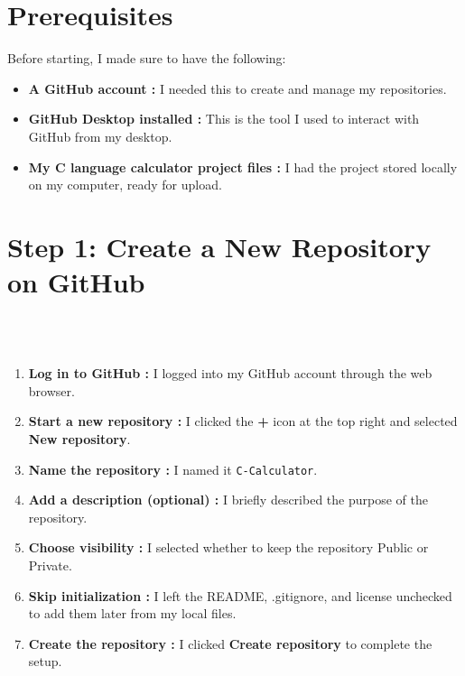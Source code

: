 \documentclass[12pt, a4paper]{article}
\begin{document}
\section*{Prerequisites}
Before starting, I made sure to have the following:

\begin{itemize}
\item \textbf{A GitHub account :} I needed this to create and manage my repositories.
\item \textbf{GitHub Desktop installed :} This is the tool I used to interact with GitHub from my desktop.
\item \textbf{My C language calculator project files :} I had the project stored locally on my computer, ready for upload.

\end{itemize}

\section*{Step 1: Create a New Repository on GitHub}
\\\
\begin{enumerate}
    \item \textbf{Log in to GitHub :} I logged into my GitHub account through the web browser.
    \item \textbf{Start a new repository :} I clicked the \textbf{+} icon at the top right and selected \textbf{New repository}.
    \item \textbf{Name the repository :} I named it \texttt{C-Calculator}.
    \item \textbf{Add a description (optional) :} I briefly described the purpose of the repository.
    \item \textbf{Choose visibility :} I selected whether to keep the repository Public or Private.
    \item \textbf{Skip initialization :} I left the README, .gitignore, and license unchecked to add them later from my local files.
    \item \textbf{Create the repository :} I clicked \textbf{Create repository} to complete the setup.

\end{enumerate}
\end{document}
